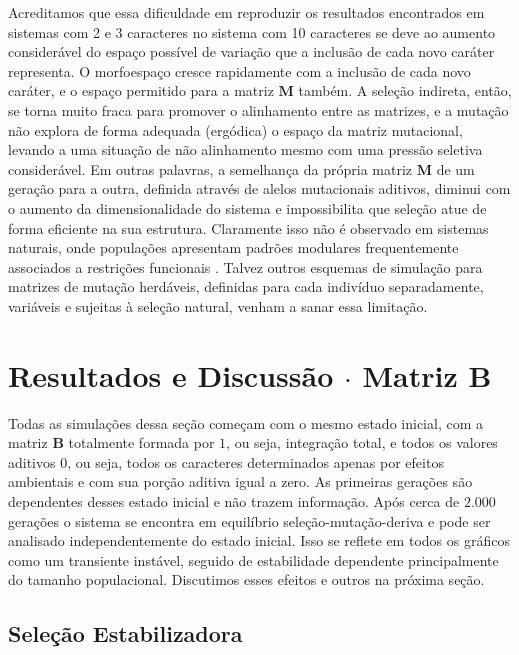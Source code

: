 Acreditamos que essa dificuldade em reproduzir os resultados encontrados
em sistemas com 2 e 3 caracteres no sistema com 10 caracteres se deve ao aumento
considerável do espaço possível de variação que a inclusão de cada novo
caráter representa. 
O morfoespaço cresce rapidamente com a inclusão de cada novo caráter, e
o espaço permitido para a matriz $\mathbf{M}$ também. 
A seleção indireta, então, se torna muito fraca para promover o
alinhamento entre as matrizes, e a mutação não explora de forma adequada
(ergódica) o espaço da matriz mutacional, levando a uma situação de não alinhamento
mesmo com uma pressão seletiva considerável. 
Em outras palavras, a semelhança da própria matriz $\mathbf{M}$ de um
geração para a outra, definida através de alelos mutacionais aditivos,
diminui com o aumento da dimensionalidade do sistema e impossibilita que
seleção atue de forma eficiente na sua estrutura.
Claramente isso não é observado em sistemas naturais, onde populações
apresentam padrões modulares frequentemente associados a restrições
funcionais \citep{Porto2009}. 
Talvez outros esquemas de simulação para matrizes de mutação herdáveis,
definidas para cada indivíduo separadamente, variáveis e sujeitas à
seleção natural, venham a sanar essa limitação.

\section{Resultados e Discussão $\cdot$ Matriz $\mathbf{B}$}

Todas as simulações dessa seção começam com o mesmo estado inicial, com
a matriz $\mathbf{B}$ totalmente formada por $1$, ou seja, integração total, e
todos os valores aditivos $0$, ou seja, todos os caracteres determinados
apenas por efeitos ambientais e com sua porção aditiva igual a zero. 
As primeiras gerações são dependentes desses estado inicial e não trazem
informação. 
Após cerca de $2.000$ gerações o sistema se encontra em equilíbrio
seleção-mutação-deriva e pode ser analisado independentemente do estado
inicial. 
Isso se reflete em todos os gráficos como um transiente instável, seguido
de estabilidade dependente principalmente do tamanho populacional.
Discutimos esses efeitos e outros na próxima seção. 

\subsection{Seleção Estabilizadora}

